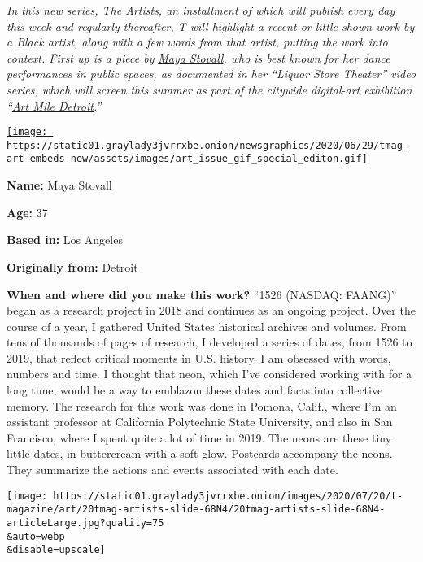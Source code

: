 \emph{In this new series, The Artists, an installment of which will
publish every day this week and regularly thereafter, T will highlight a
recent or little-shown work by a Black artist, along with a few words
from that artist, putting the work into context. First up is a piece by}
\href{https://mayastovall.com/home.html}{\emph{Maya Stovall}}\emph{, who
is best known for her dance performances in public spaces, as documented
in her ``Liquor Store Theater'' video series, which will screen this
summer as part of the citywide digital-art exhibition
``}\href{https://www.artmiledetroit.com/}{\emph{Art Mile
Detroit}}\emph{.''}

\href{https://www.nytimes3xbfgragh.onion/issue/t-magazine/2020/07/02/true-believers-art-issue}{\texttt{[image: https://static01.graylady3jvrrxbe.onion/newsgraphics/2020/06/29/tmag-art-embeds-new/assets/images/art\_issue\_gif\_special\_editon.gif]}}

\textbf{Name:} Maya Stovall

\textbf{Age:} 37

\textbf{Based in:} Los Angeles

\textbf{Originally from:} Detroit

\textbf{When and where did you make this work?} ``1526 (NASDAQ: FAANG)''
began as a research project in 2018 and continues as an ongoing project.
Over the course of a year, I gathered United States historical archives
and volumes. From tens of thousands of pages of research, I developed a
series of dates, from 1526 to 2019, that reflect critical moments in
U.S. history. I am obsessed with words, numbers and time. I thought that
neon, which I've considered working with for a long time, would be a way
to emblazon these dates and facts into collective memory. The research
for this work was done in Pomona, Calif., where I'm an assistant
professor at California Polytechnic State University, and also in San
Francisco, where I spent quite a lot of time in 2019. The neons are
these tiny little dates, in buttercream with a soft glow. Postcards
accompany the neons. They summarize the actions and events associated
with each date.

\texttt{[image: https://static01.graylady3jvrrxbe.onion/images/2020/07/20/t-magazine/art/20tmag-artists-slide-68N4/20tmag-artists-slide-68N4-articleLarge.jpg?quality=75\\\&auto=webp\\\&disable=upscale]}

